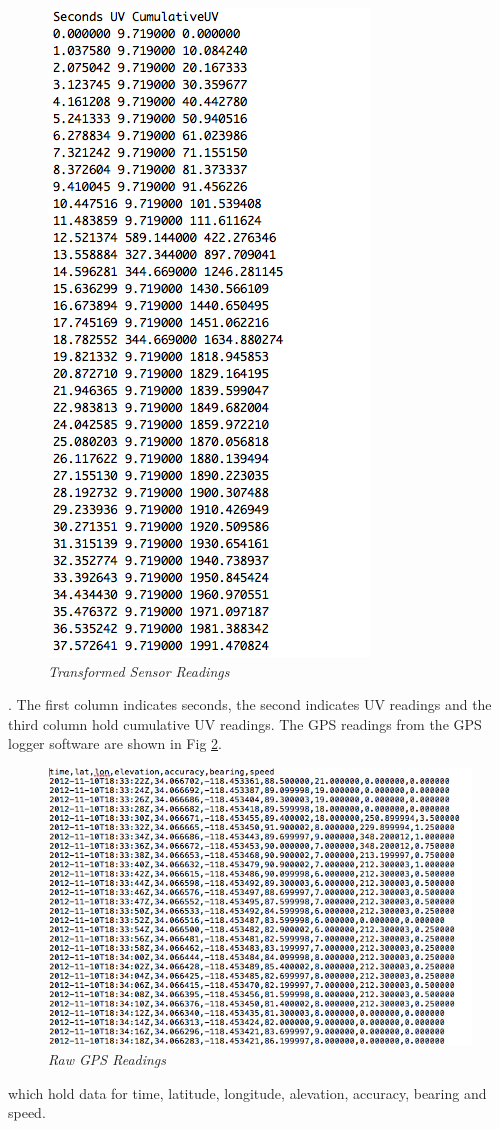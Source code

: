 \documentclass[12pt,fullpage,doublespace]{article}
\begin{document}
\begin{figure}
\begin{center}
\includegraphics[scale=0.45]{transformedData.png}
\caption{\small \sl Transformed Sensor Readings\label{fig:transformedData}}
\end{center}
\end{figure}. The first column indicates seconds, the second indicates UV readings and the third column hold cumulative UV readings. The GPS readings from the GPS logger software are shown in Fig \ref{fig:gpsReadings}. 
\begin{figure}
\begin{center}
\includegraphics[scale=0.45]{gpsReadings.png}
\caption{\small \sl Raw GPS Readings\label{fig:gpsReadings}}
\end{center}
\end{figure} which hold data for time, latitude, longitude, alevation, accuracy, bearing and speed. 
\end{document}
